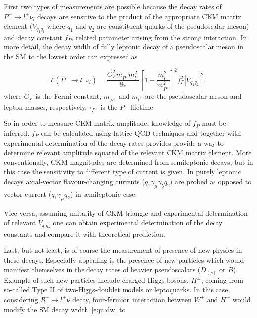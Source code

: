 First two types of measurements are possible because the decay rates of $P^{+}\rightarrow l^{+} \nu_{l}$ decays are sensitive to the product of the appropriate \gls{CKM} matrix element ($V_{q_{1}q_{2}}$ where $q_{1}$ and $q_{2}$ are constituent quarks of the pseudoscalar meson) and decay constant $f_{P}$, related parameter arising from the strong interaction. In more detail, the decay width of fully leptonic decay of a pseudoscalar meson in the \gls{SM} to the lowest order can expressed as 

\begin{equation}
\Gamma(P^{+} \rightarrow {l^{+}} \nu_{l})=  
	\frac{G_{F}^{2} m^{}_{P^{+}}  m_{l^{+}}^{2}}{8\pi} 
	\left[1 - \frac{m_{l^{+}}^{2}}{m_{P^{+}}^{2}}\right]^{2}  
	f_{P}^{2} |V_{q_{1}q_{2}}|^{2} 
	,
\label{eqn:dw} 
\end{equation}
where
$G_F$ is the Fermi constant,
$m^{}_{P^{+}}$ and $m_{l^{+}}$ are the pseudoscalar meson and lepton masses, respectively,
$\tau_{P^{+}}$ is the $P^{+}$ lifetime.

So in order to measure \gls{CKM} matrix amplitude, knowledge of $f_{P}$ must be inferred. $f_{P}$ can be calculated using lattice \gls{QCD} techniques and together with experimental determination of the decay rates provides provide a way to determine relevant amplitude squared of the relevant \gls{CKM} matrix element. More conventionally, \gls{CKM} magnitudes are determined from semileptonic decays, but in this case the sensitivity to different type of current is given. In purely leptonic decays axial-vector flavour-changing currents ($q_{1}\gamma_{\mu}\gamma_{5}q_{2}$) are probed as opposed to vector current ($q_{1}\gamma_{\mu}q_{2}$) in semileptonic case.

Vice versa, assuming unitarity of \gls{CKM} triangle and experimental determination of relevant $V_{q_{1}q_{2}}$ one can obtain experimental determination of the decay constants and compare it with theoretical prediction.

Last, but not least, is of course the measurement of presence of new physics in these decays. Especially appealing is the presence of new particles which would manifest themselves in the decay rates of heavier pseudoscalars ($D_{(s)}$ or $B$). Example of such new particles include charged Higgs bosons, $H^{\pm}$, coming from so-called Type II of two-Higgs-doublet models \cite{Hou:1992sy}\cite{Akeroyd:2003zr}\cite{Dobrescu:2008er} or leptoquarks\cite{Dobrescu:2008er}. In this case, considering $B^{+}\rightarrow l^{+}\nu$ decay, four-fermion interaction between $W^{\pm}$ and $H^{\pm}$ would modify the \gls{SM} decay width~\autoref{eqn:dw} to

